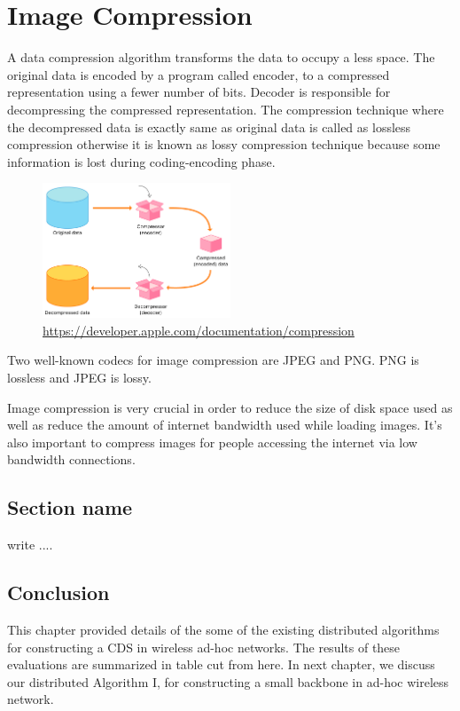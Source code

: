 \chapter{Image Compression}

A data compression algorithm transforms the data to occupy a less space. The original data is encoded by a program called encoder, to a compressed representation using a fewer number of bits. Decoder is responsible for decompressing the compressed representation. The compression technique where the decompressed data is exactly same as original data is called as lossless compression otherwise it is known as lossy compression technique because some information is lost during coding-encoding phase.

\begin{figure}[!ht]
    \centering
    \includegraphics[width=0.50\textwidth]{fig/1-3.png}
    {\url{https://developer.apple.com/documentation/compression}}
    \label{fig:phasesCompression}
\end{figure}

Two well-known codecs for image compression are JPEG and PNG. PNG is lossless and JPEG is lossy.

Image compression is very crucial in order to reduce the size of disk space used as well as reduce the amount of internet bandwidth used while loading images. It’s also important to compress images for people accessing the internet via low bandwidth connections.

\section{Section name}

write ....

\section{Conclusion}

This chapter provided details of the some of the existing
distributed algorithms for constructing a CDS in wireless ad-hoc
networks. The results of these evaluations are summarized in table
cut from here. In next chapter, we discuss our distributed
Algorithm I, for constructing a small backbone in ad-hoc wireless
network.


